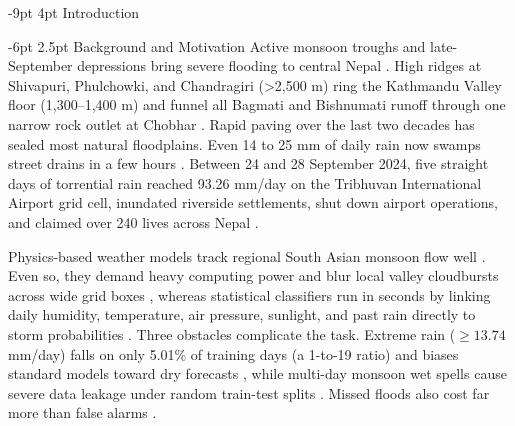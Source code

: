 \documentclass[10pt,twocolumn,a4paper]{article}
\makeatletter
\renewcommand{\section}{\@startsection{section}{1}{\z@}%
  {-9pt \@plus -2pt \@minus -1pt}%
  {4pt \@plus 1pt}%
  {\centering\normalfont\normalsize\bfseries\scshape}}
\renewcommand{\subsection}{\@startsection{subsection}{2}{\z@}%
  {-6pt \@plus -1.5pt \@minus -0.5pt}%
  {2.5pt \@plus 0.5pt}%
  {\normalfont\normalsize\bfseries\itshape}}
\makeatother
\begin{document}
\section{Introduction}

\subsection{Background and Motivation}
Active monsoon troughs and late-September depressions bring severe flooding to central Nepal \cite{ref1,ref2,ref3}. High ridges at Shivapuri, Phulchowki, and Chandragiri (>2,500 m) ring the Kathmandu Valley floor (1,300--1,400 m) and funnel all Bagmati and Bishnumati runoff through one narrow rock outlet at Chobhar \cite{ref4,ref5}. Rapid paving over the last two decades has sealed most natural floodplains. Even 14 to 25 mm of daily rain now swamps street drains in a few hours \cite{ref5,ref6,ref7,ref8}. Between 24 and 28 September 2024, five straight days of torrential rain reached 93.26 mm/day on the Tribhuvan International Airport grid cell, inundated riverside settlements, shut down airport operations, and claimed over 240 lives across Nepal \cite{ref6,ref7}.

Physics-based weather models track regional South Asian monsoon flow well \cite{ref9,ref10,ref11}. Even so, they demand heavy computing power and blur local valley cloudbursts across wide grid boxes \cite{ref3,ref12}, whereas statistical classifiers run in seconds by linking daily humidity, temperature, air pressure, sunlight, and past rain directly to storm probabilities \cite{ref1,ref2,ref12}. Three obstacles complicate the task. Extreme rain ($\ge 13.74$ mm/day) falls on only 5.01\% of training days (a 1-to-19 ratio) and biases standard models toward dry forecasts \cite{ref2,ref3}, while multi-day monsoon wet spells cause severe data leakage under random train-test splits \cite{ref1,ref13}. Missed floods also cost far more than false alarms \cite{ref3,ref6}.
\end{document}
